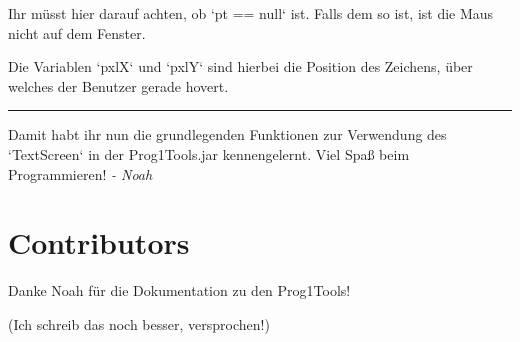 \documentclass[12pt,a4paper]{article}
\begin{document}
Ihr müsst hier darauf achten, ob `pt == null` ist. Falls dem so ist, ist die Maus nicht auf dem Fenster.

Die Variablen `pxlX` und `pxlY` sind hierbei die Position des Zeichens, über welches der Benutzer gerade hovert.

\bigskip
\hrule
\bigskip

Damit habt ihr nun die grundlegenden Funktionen zur Verwendung des `TextScreen` in der Prog1Tools.jar kennengelernt. Viel Spaß beim Programmieren! \textit{- Noah}

\newpage
{}
\setcounter{section}{0}
\renewcommand{\thesection}{\arabic{section}}

\section{Contributors}
Danke Noah für die Dokumentation zu den Prog1Tools!

(Ich schreib das noch besser, versprochen!)
\end{document}
